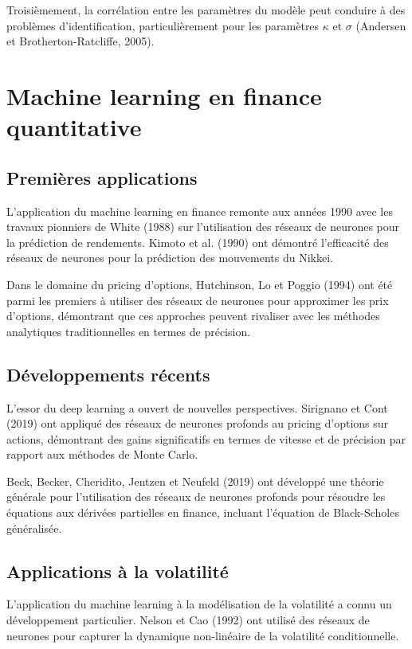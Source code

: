 Troisièmement, la corrélation entre les paramètres du modèle peut conduire à des problèmes d'identification, particulièrement pour les paramètres $\kappa$ et $\sigma$ (Andersen et Brotherton-Ratcliffe, 2005).

\section{Machine learning en finance quantitative}

\subsection{Premières applications}

L'application du machine learning en finance remonte aux années 1990 avec les travaux pionniers de White (1988) sur l'utilisation des réseaux de neurones pour la prédiction de rendements. Kimoto et al. (1990) ont démontré l'efficacité des réseaux de neurones pour la prédiction des mouvements du Nikkei.

Dans le domaine du pricing d'options, Hutchinson, Lo et Poggio (1994) ont été parmi les premiers à utiliser des réseaux de neurones pour approximer les prix d'options, démontrant que ces approches peuvent rivaliser avec les méthodes analytiques traditionnelles en termes de précision.

\subsection{Développements récents}

L'essor du deep learning a ouvert de nouvelles perspectives. Sirignano et Cont (2019) ont appliqué des réseaux de neurones profonds au pricing d'options sur actions, démontrant des gains significatifs en termes de vitesse et de précision par rapport aux méthodes de Monte Carlo.

Beck, Becker, Cheridito, Jentzen et Neufeld (2019) ont développé une théorie générale pour l'utilisation des réseaux de neurones profonds pour résoudre les équations aux dérivées partielles en finance, incluant l'équation de Black-Scholes généralisée.

\subsection{Applications à la volatilité}

L'application du machine learning à la modélisation de la volatilité a connu un développement particulier. Nelson et Cao (1992) ont utilisé des réseaux de neurones pour capturer la dynamique non-linéaire de la volatilité conditionnelle.

